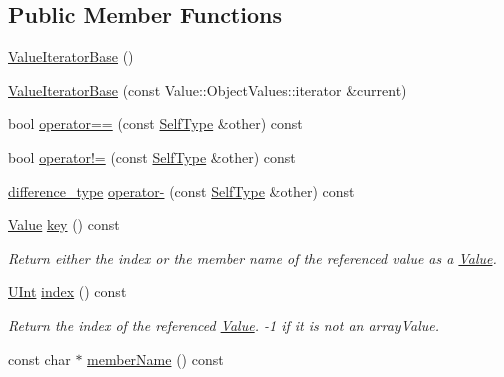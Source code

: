 \subsection*{Public Member Functions}
\begin{DoxyCompactItemize}
\item 
\hyperlink{classJson_1_1ValueIteratorBase_af45b028d9ff9cbd2554a87878b42dd75}{Value\-Iterator\-Base} ()
\item 
\hyperlink{classJson_1_1ValueIteratorBase_a640e990e5f03a96fd650122a2906f59d}{Value\-Iterator\-Base} (const Value\-::\-Object\-Values\-::iterator \&current)
\item 
bool \hyperlink{classJson_1_1ValueIteratorBase_afc656672ac28502f640ade32c38c1b56}{operator==} (const \hyperlink{classJson_1_1ValueIteratorBase_a9d2a940d03ea06d20d972f41a89149ee}{Self\-Type} \&other) const 
\item 
bool \hyperlink{classJson_1_1ValueIteratorBase_a18c2dd42e0bb989ace141bfe9de52792}{operator!=} (const \hyperlink{classJson_1_1ValueIteratorBase_a9d2a940d03ea06d20d972f41a89149ee}{Self\-Type} \&other) const 
\item 
\hyperlink{classJson_1_1ValueIteratorBase_a4e44bf8cbd17ec8d6e2c185904a15ebd}{difference\-\_\-type} \hyperlink{classJson_1_1ValueIteratorBase_ab786787fcad68ca5e8745aaf520fa17f}{operator-\/} (const \hyperlink{classJson_1_1ValueIteratorBase_a9d2a940d03ea06d20d972f41a89149ee}{Self\-Type} \&other) const 
\item 
\hyperlink{classJson_1_1Value}{Value} \hyperlink{classJson_1_1ValueIteratorBase_aa2ff5e79fc96acd4c3cd288e92614fc7}{key} () const 
\begin{DoxyCompactList}\small\item\em Return either the index or the member name of the referenced value as a \hyperlink{classJson_1_1Value}{Value}. \end{DoxyCompactList}\item 
\hyperlink{namespaceJson_a800fb90eb6ee8d5d62b600c06f87f7d4}{U\-Int} \hyperlink{classJson_1_1ValueIteratorBase_aa90591f5f7f8d2f06cc4605816b53738}{index} () const 
\begin{DoxyCompactList}\small\item\em Return the index of the referenced \hyperlink{classJson_1_1Value}{Value}. -\/1 if it is not an array\-Value. \end{DoxyCompactList}\item 
const char $\ast$ \hyperlink{classJson_1_1ValueIteratorBase_ac05e6bda279201f09803b7f347ddf057}{member\-Name} () const 

\end{DoxyCompactItemize}

